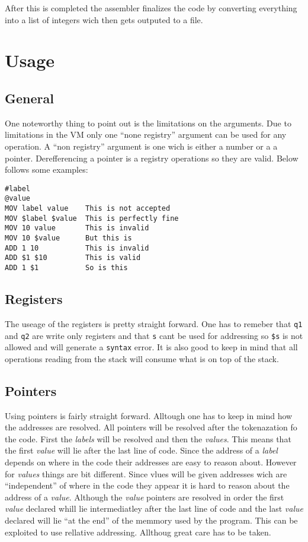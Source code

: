 \documentclass{article}
\newcommand{\V}{\verb}
\begin{document}
After this is completed the assembler finalizes the code by converting
everything into a list of integers wich then gets outputed to a file.

\section{Usage}
\subsection{General}
One noteworthy thing to point out is the limitations on the arguments. Due to
limitations in the VM only one ``none registry'' argument can be used for any
operation. A ``non registry'' argument is one wich is either a number or a
a pointer. Derefferencing a pointer is a registry operations so they are valid.
Below follows some examples:
\begin{verbatim}
#label
@value
MOV label value    This is not accepted
MOV $label $value  This is perfectly fine
MOV 10 value       This is invalid
MOV 10 $value      But this is
ADD 1 10           This is invalid
ADD $1 $10         This is valid
ADD 1 $1           So is this
\end{verbatim}

\subsection{Registers}
The useage of the registers is pretty straight forward. One has to remeber that
\V+q1+ and \V+q2+ are write only registers and that \V+s+ cant be used for
addressing so \verb+$s+ is not allowed and will generate a \verb+syntax+ error.
It is also good to keep in mind that all operations reading from the stack will
consume what is on top of the stack.

\subsection{Pointers}
Using pointers is fairly straight forward. Alltough one has to keep in mind how
the addresses are resolved. All pointers will be resolved after the
tokenazation fo the code. First the \emph{labels} will be resolved and then the
\emph{values}.
This means that the first \emph{value} will lie after the last line of code. Since the
address of a \emph{label} depends on where in the code their addresses are easy to
reason about. However for \emph{values} things are bit different. Since vlues
will be given addresses wich are ``independent'' of where in the code they appear it is
hard to reason about the address of a \emph{value}. Although the \emph{value} pointers are
resolved in order the first \emph{value} declared whill lie intermediatley after the
last line of code and the last \emph{value} declared will lie ``at the end'' of the
memmory used by the program. This can be exploited to use rellative addressing.
Allthoug great care has to be taken.
\end{document}

